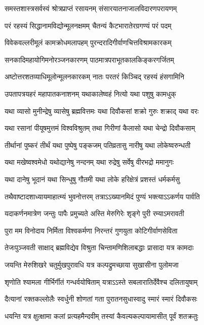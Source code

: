 \twolineshloka
{समस्तशास्त्रसर्वस्वं श्रोत्रप्राप्तं रसायनम्}
{संसारयातनाजालविदारणपरायणम्} %

\twolineshloka
{परं रहस्यं सिद्धानामविद्योन्मूलनक्षमम्}
{चैतन्यं कैटभारातेरग्रगण्यं परं पदम्} %

\twolineshloka
{विवेकवल्लरीमूलं कामक्रोधमलापहम्}
{पुरन्दरादिगीर्वाणचित्तविश्रामकारकम्} %

\twolineshloka
{सनकादिमहायोगिमनोरञ्जनकारणम्}
{पाठमात्रपराभूतकालकिङ्करगर्जितम्} %

\twolineshloka
{अष्टोत्तरशतव्याधिमूलोन्मूलनकारकम्}
{नातः परतरं किञ्चिद् रहस्यं हंसगामिनि} %

\twolineshloka
{उपतापत्रयहरं महापातकनाशनम्}
{यथाकालेष्वहं नित्यो यथा पशुषु कामधुक्} %

\twolineshloka
{यथा व्यासो मुनीन्द्रेषु व्यासेषु ब्रह्मवित्तमः}
{यथा दिवौकसां शक्रो गुरुः शक्राद् यथा वरः} %

\twolineshloka
{यथा रसानां पीयूषमुत्तमं विश्वविश्रुतम्}
{तथा गिरीणां कैलासो यथा चेन्द्रो दिवौकसाम्} %

\twolineshloka
{तीर्थानां पुष्करं तीर्थं यथा पुष्पेषु पङ्कजम्}
{पतिव्रतासु नारीषु यथा लोकेष्वरुन्धती} %

\twolineshloka
{यथा मखेष्वश्वमेधो यथोद्यानेषु नन्दनम्}
{यथा रुद्रेषु सर्वेषु वीरभद्रो ममानुगः} %

\twolineshloka
{यथा दानेषु भूदानं यथा सिन्धुषु गौतमी}
{यथा लोके हरिक्षेत्रं प्रशस्तं धर्मकर्मसु} %

\twolineshloka
{तथैवाष्टादशाध्यायमाहात्म्यं भुवनोत्तरम्}
{तत्राऽऽख्यानमिदं पुण्यं भक्त्याऽऽकर्णय पार्वति} %

\twolineshloka
{यदाकर्णनमात्रेण जन्तुः पापैः प्रमुच्यते}
{अस्ति मेरुगिरेः शृङ्गे पुरी रम्याऽमरावती} %

\twolineshloka
{पुरा मम विनोदाय निर्मिता विश्वकर्मणा}
{निरन्तरं गुणयुता कोटिगीर्वाणसेविता} %

\twolineshloka
{तेजःपुञ्जवती साक्षाद् ब्रह्मविद्येव विश्रुता}
{चिन्तामणिशिलाबद्धाः प्रासादा यत्र कामदाः} %

\twolineshloka
{जयन्ति मेरुशिखरे चतुर्मुखपुरावधि}
{यत्र कल्पद्रुमच्छाया सुखासीना पुलोमजा} %

\twolineshloka
{शृणोति श्यामला गीर्भिर्गीतं गन्धर्वयोषिताम्}
{यत्राऽऽस्ते सबलारातिर्देवैश्च दलितायुषाम्} %

\twolineshloka
{दैत्यानां रक्तकल्लोलैः स्वर्धुनी शोणतां गता}
{पुरातनसुधास्वादु स्मारं स्मारं दिवौकसः} %

\twolineshloka
{धयन्ति यत्र क्षुत्क्षामा कलां प्रत्यहमैन्दवीम्}
{तस्यां कैवल्यकल्पायामासीत् पूर्वं शतक्रतुः} %

